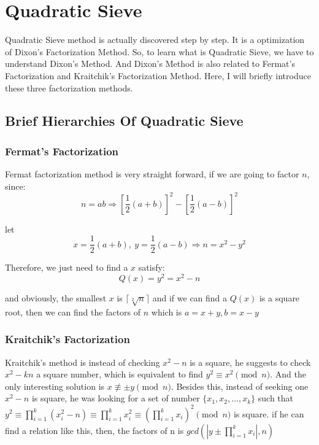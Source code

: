 \documentclass[12pt]{article} %
\begin{document}
\section{Quadratic Sieve}

Quadratic Sieve method is actually discovered step by step. It is a optimization of Dixon's Factorization Method. So, to learn what is Quadratic Sieve, we have to understand Dixon's Method. And Dixon's Method is also related to Fermat's Factorization and Kraitchik's Factorization Method. Here, I will briefly introduce these three factorization methods.

\subsection {Brief Hierarchies Of Quadratic Sieve}

\subsubsection {Fermat's Factorization}
Fermat factorization method is very straight forward, if we are going to factor $n$, since: $$n = ab \Rightarrow \left [\frac{1}{2}(a+b) \right ]^{2} - \left [\frac{1}{2}(a-b) \right ]^{2}$$

let $$ x= \frac{1}{2}(a+b),\ y= \frac{1}{2}(a-b) \Rightarrow n = x^2 - y^2$$ 

Therefore, we just need to find a $x$ satisfy: $$Q(x) = y^2 = x^2 - n$$ 

and obviously, the smallest $x$ is $\lceil \sqrt[2]{n}\rceil$ and if we can find a $Q(x)$ is a square root, then we can find the factors of $n$ which is $a=x+y, b=x-y$

\subsubsection {Kraitchik's Factorization}
Kraitchik's method is instead of checking $x^2-n$ is a square, he suggests to check $x^2 - kn$ a square number, which is equivalent to find $y^2 \equiv x^2 \pmod{n} $. And the only interesting solution is $ x \not\equiv \pm y \pmod{n}$. Besides this, instead of seeking one $x^2-n$ is square, he was looking for a set of number $ \{x_1, x_2, \dots, x_k\} $ such that $\displaystyle y^2 \equiv \prod_{i=1}^k{(x_i^2 - n)} \equiv \prod_{i=1}^k{x_i^2} \equiv \left (\prod_{i=1}^k{x_i}\right)^2 \pmod{n} $ is square. if he can find a relation like this, then, the factors of n is $\displaystyle gcd(|y \pm \prod_{i=1}^k{x_i}|, n)$
\end{document}
